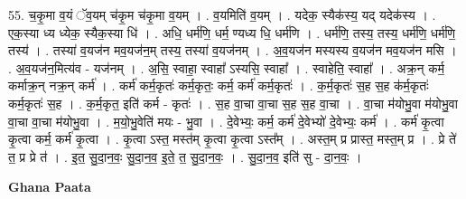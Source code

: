 \documentclass[17pt]{extarticle}
\begin{document}
55. च॒कृ॒मा व॒यं ॅव॒यम् च॑कृ॒म च॑कृ॒मा व॒यम् । . व॒यमिति॑ व॒यम् । . यदेक॒ स्यैक॑स्य॒ यद् यदेक॑स्य । . एक॒स्या ध्य ध्येक॒ स्यैक॒स्या धि॑ । . अधि॒ धर्म॑णि॒ धर्म॒ ण्यध्य धि॒ धर्म॑णि । . धर्म॑णि॒ तस्य॒ तस्य॒ धर्म॑णि॒ धर्म॑णि॒ तस्य॑ । . तस्या॑ व॒यज॑न मव॒यज॑न॒म् तस्य॒ तस्या॑ व॒यज॑नम् । . अ॒व॒यज॑न मस्यस्य व॒यज॑न मव॒यज॑न मसि । . अ॒व॒यज॑न॒मित्य॑व - यज॑नम् । . अ॒सि॒ स्वाहा॒ स्वाहा᳚ ऽस्यसि॒ स्वाहा᳚ । . स्वाहेति॒ स्वाहा᳚ । . अक्र॒न् कर्म॒ कर्माक्र॒न् नक्र॒न् कर्म॑ । . कर्म॑ कर्म॒कृतः॑ कर्म॒कृतः॒ कर्म॒ कर्म॑ कर्म॒कृतः॑ । . क॒र्म॒कृतः॑ स॒ह स॒ह क॑र्म॒कृतः॑ कर्म॒कृतः॑ स॒ह । . क॒र्म॒कृत॒ इति॑ कर्म - कृतः॑ । . स॒ह वा॒चा वा॒चा स॒ह स॒ह वा॒चा । . वा॒चा म॑योभु॒वा म॑योभु॒वा वा॒चा वा॒चा म॑योभु॒वा । . म॒यो॒भु॒वेति॑ मयः - भु॒वा । . दे॒वेभ्यः॒ कर्म॒ कर्म॑ दे॒वेभ्यो॑ दे॒वेभ्यः॒ कर्म॑ । . कर्म॑ कृ॒त्वा कृ॒त्वा कर्म॒ कर्म॑ कृ॒त्वा । . कृ॒त्वा ऽस्त॒ मस्त॑म् कृ॒त्वा कृ॒त्वा ऽस्त᳚म् । . अस्त॒म् प्र प्रास्त॒ मस्त॒म् प्र । . प्रे ते॑ त॒ प्र प्रे त॑ । . इ॒त॒ सु॒दा॒न॒वः॒ सु॒दा॒न॒व॒ इ॒ते॒ त॒ सु॒दा॒न॒वः॒ । . सु॒दा॒न॒व॒ इति॑ सु - दा॒न॒वः॒ । \newline

\textbf{Ghana Paata } \newline
\end{document}

